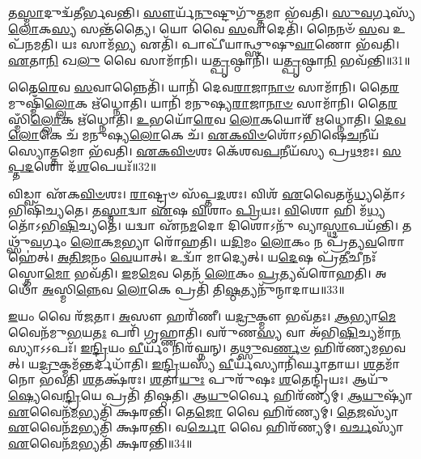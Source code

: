 𑌤\-\ul{𑌸𑍍𑌮𑌾}\-𑌦𑍁𑌦𑍍𑌵᳴𑌤𑍀𑌰𑍍𑌭𑌵𑌨𑍍𑌤𑌿।
\-\ul{𑌸𑍗}\-𑌰𑍍𑌯᳴\-\ul{𑌨𑍁}\-𑌷𑍍𑌟𑍁𑌗𑍁᳴\-\ul{𑌤𑍍𑌤}\-𑌮𑌾 𑌭᳴𑌵𑌤𑌿।
\-\ul{𑌸𑍁}\-\-\ul{𑌵}\-𑌰𑍍𑌗𑌸𑍍𑌯᳴ \ul{𑌲𑍋}\-𑌕\-\ul{𑌸𑍍𑌯} 𑌸𑌨𑍍𑌤᳴𑌤𑍍𑌯𑍈।
𑌯𑍋 𑌵𑍈 \ul{𑌸}\-𑌵𑌾𑌦𑍇𑌤𑌿᳴।
𑌨𑍈𑌨𑍞᳴ \ul{𑌸}\-𑌵 𑌉𑌪᳴𑌨𑌮𑌤𑌿।
𑌯𑌃 𑌸𑌾𑌮᳴\-\ul{𑌭𑍍𑌯} 𑌏𑌤𑌿᳴।
𑌪𑌾𑌪𑍀᳴𑌯𑌾𑌨𑍍𑌥𑍍𑌸𑍁𑌷𑍁\-\ul{𑌵𑌾}\-𑌣𑍋 𑌭᳴𑌵𑌤𑌿।
\-\ul{𑌏}\-𑌤𑌾\-\ul{𑌨𑌿} 𑌖\-\ul{𑌲𑍁} 𑌵𑍈 𑌸𑌾𑌮𑌾᳴𑌨𑌿।
𑌯\-\ul{𑌤𑍍𑌪𑍃}\-𑌷𑍍𑌠𑌾𑌨𑌿᳴।
𑌯\-\ul{𑌤𑍍𑌪𑍃}\-𑌷𑍍𑌠𑌾\-\ul{𑌨𑌿} 𑌭𑌵᳴𑌨𑍍𑌤𑌿॥31॥

𑌤𑍈\-\ul{𑌰𑍇}\-𑌵 \ul{𑌸}\-𑌵𑌾𑌨𑍍𑌨𑍈𑌤𑌿᳴।
𑌯𑌾𑌨𑌿᳴ 𑌦𑍇𑌵\-\ul{𑌰𑌾}\-𑌜𑌾\-\ul{𑌨𑌾}\-\-\ul{𑍞} 𑌸𑌾𑌮𑌾᳴𑌨𑌿।
𑌤𑍈\-\ul{𑌰}\-𑌮𑍁𑌷𑍍𑌮𑌿𑌁᳴\-\ul{𑌲𑍍𑌲𑍋}\-𑌕 𑌋᳴𑌧𑍍𑌨𑍋𑌤𑌿।
𑌯𑌾𑌨𑌿᳴ 𑌮𑌨𑍁𑌷𑍍𑌯\-\ul{𑌰𑌾}\-𑌜𑌾\-\ul{𑌨𑌾}\-\-\ul{𑍞} 𑌸𑌾𑌮𑌾᳴𑌨𑌿।
𑌤𑍈\-\ul{𑌰}\-𑌸𑍍𑌮𑌿𑌁\-\ul{𑌲𑍍𑌲𑍋}\-𑌕 𑌋᳴𑌧𑍍𑌨𑍋𑌤𑌿।
\-\ul{𑌉}\-𑌭𑌯𑍋᳴\-\ul{𑌰𑍇}\-𑌵 \ul{𑌲𑍋}\-𑌕𑌯𑍋𑌰𑍍᳴ 𑌋𑌧𑍍𑌨𑍋𑌤𑌿।
\-\ul{𑌦𑍇}\-\-\ul{𑌵}\-\-\ul{𑌲𑍋}\-𑌕𑍇 𑌚᳴ 𑌮𑌨𑍁𑌷𑍍𑌯\-\ul{𑌲𑍋}\-𑌕𑍇 𑌚᳴।
\-\ul{𑌏}\-\-\ul{𑌕}\-\-\ul{𑌵𑌿}\-\-\ul{𑍞}\-𑌶𑍋᳴\-𑌽𑌭𑌿𑌷𑍇\-\ul{𑌚}\-𑌨𑍀𑌯᳴𑌸𑍍𑌯𑍋\-\ul{𑌤𑍍𑌤}\-𑌮𑍋 𑌭᳴𑌵𑌤𑌿।
\-\ul{𑌏}\-\-\ul{𑌕}\-\-\ul{𑌵𑌿}\-\-\ul{𑍞}\-𑌶𑌃 𑌕𑍇᳴𑌶𑌵\-\ul{𑌪}\-𑌨𑍀𑌯᳴𑌸𑍍𑌯 𑌪𑍍𑌰\-\ul{𑌥}\-𑌮𑌃।
\-\ul{𑌸}\-\-\ul{𑌪𑍍𑌤}\-\-\ul{𑌦}\-𑌶𑍋 𑌦᳴\-\ul{𑌶}\-𑌪𑍇𑌯𑌃᳴॥32॥

𑌵𑌿𑌡𑍍𑌵𑌾 𑌏᳴𑌕\-\ul{𑌵𑌿}\-\-\ul{𑍞}\-𑌶𑌃।
\-\ul{𑌰𑌾}\-𑌷𑍍𑌟𑍍𑌰𑍞 𑌸᳴𑌪𑍍𑌤\-\ul{𑌦}\-𑌶𑌃।
𑌵𑌿𑌶᳴ \ul{𑌏}\-𑌵𑍈𑌤𑌨𑍍𑌮᳴\-\ul{𑌧𑍍𑌯}\-𑌤𑍋᳴\-𑌽𑌭𑌿𑌷𑌿᳴𑌚𑍍𑌯𑌤𑍇।
𑌤\-\ul{𑌸𑍍𑌮𑌾}\-𑌦𑍍𑌵𑌾 \ul{𑌏}\-𑌷 \ul{𑌵𑌿}\-𑌶𑌾𑌂 \ul{𑌪𑍍𑌰𑌿}\-𑌯𑌃।
\-\ul{𑌵𑌿}\-𑌶𑍋 𑌹𑌿 𑌮᳴\-\ul{𑌧𑍍𑌯}\-𑌤𑍋᳴\-𑌽𑌭𑌿\-\ul{𑌷𑌿}\-𑌚𑍍𑌯𑌤𑍇॑।
𑌯𑌦𑍍𑌵𑌾 𑌏᳴𑌨\-\ul{𑌮}\-𑌦𑍋 𑌦𑌿𑌶𑍋𑌽𑌨𑍁᳴ 𑌵𑍍𑌯𑌾\-\ul{𑌸𑍍𑌥𑌾}\-𑌪𑌯᳴𑌨𑍍𑌤𑌿।
𑌤𑌥𑍍𑌸𑍁᳴\-\ul{𑌵}\-𑌰𑍍𑌗𑌂 \ul{𑌲𑍋}\-𑌕\-\ul{𑌮}\-𑌭𑍍𑌯𑌾 𑌰𑍋᳴𑌹𑌤𑌿।
𑌯\-\ul{𑌦𑌿}\-𑌮𑌂 \ul{𑌲𑍋}\-𑌕𑌂 𑌨 𑌪𑍍𑌰᳴𑌤𑍍𑌯\-\ul{𑌵}\-𑌰𑍋𑌹𑍇॑𑌤𑍍।
\-\ul{𑌅}\-\-\ul{𑌤𑌿}\-\-\ul{𑌜}\-𑌨𑌂 \ul{𑌵𑍇}\-𑌯𑌾𑌤𑍍।
𑌉𑌦𑍍𑌵𑌾᳴ 𑌮𑌾𑌦𑍍𑌯𑍇𑌤𑍍।
𑌯\-\ul{𑌦𑍇}\-𑌷 𑌪𑍍𑌰᳴\-\ul{𑌤𑍀}\-𑌚𑍀𑌨𑌃᳴ 𑌸𑍍𑌤𑍋\-\ul{𑌮𑍋} 𑌭𑌵᳴𑌤𑌿।
\-\ul{𑌇}\-𑌮\-\ul{𑌮𑍇}\-𑌵 𑌤𑍇𑌨᳴ \ul{𑌲𑍋}\-𑌕𑌂 \ul{𑌪𑍍𑌰}\-𑌤𑍍𑌯𑌵᳴𑌰𑍋𑌹𑌤𑌿।
𑌅𑌥𑍋᳴ \ul{𑌅}\-𑌸𑍍𑌮𑌿\-\ul{𑌨𑍍𑌨𑍇}\-𑌵 \ul{𑌲𑍋}\-𑌕𑍇 𑌪𑍍𑌰𑌤𑌿᳴ 𑌤𑌿\-\ul{𑌷𑍍𑌠}\-𑌤𑍍𑌯𑌨𑍁᳴𑌨𑍍𑌮𑌾𑌦𑌾𑌯॥33॥\anuvakamend[𑌅𑌕𑍍𑌰᳴𑌨𑍍𑌰𑌾\-\ul{𑌜}\-𑌨𑍍𑌯𑍋᳴ 𑌭𑌵᳴𑌨𑍍𑌤𑌿 𑌦\-\ul{𑌶}\-𑌪𑍇𑌯𑍋᳴ 𑌮𑌾\-\ul{𑌦𑍍𑌯𑍇}\-𑌤𑍍𑌤𑍍𑌰𑍀𑌣𑌿᳴ 𑌚]

\-\ul{𑌇}\-𑌯𑌂 𑌵𑍈 𑌰᳴\-\ul{𑌜}\-𑌤𑌾।
\-\ul{𑌅}\-𑌸𑍗 𑌹𑌰𑌿᳴𑌣𑍀।
𑌯\-\ul{𑌦𑍍𑌰𑍁}\-𑌕𑍍𑌮𑍗 𑌭𑌵᳴𑌤𑌃।
\-\ul{𑌆}\-𑌭𑍍𑌯𑌾\-\ul{𑌮𑍇}\-𑌵𑍈𑌨᳴𑌮𑍁\-\ul{𑌭}\-𑌯\-\ul{𑌤𑌃} 𑌪𑌰𑌿᳴ 𑌗𑍃𑌹𑍍𑌣𑌾𑌤𑌿।
𑌵𑌰𑍁᳴𑌣\-\ul{𑌸𑍍𑌯} 𑌵𑌾 𑌅᳴𑌭𑌿\-\ul{𑌷𑌿}\-𑌚𑍍𑌯𑌮𑌾᳴\-\ul{𑌨}\-𑌸𑍍𑌯𑌾\-𑌽𑌽𑌪𑌃᳴।
\-\ul{𑌇}\-\-\ul{𑌨𑍍𑌦𑍍𑌰𑌿}\-𑌯𑌂 \ul{𑌵𑍀}\-𑌰𑍍𑌯𑌂᳴ 𑌨𑌿𑌰᳴𑌘𑍍𑌨𑌨𑍍।
𑌤\-\ul{𑌥𑍍𑌸𑍁}\-𑌵\-\ul{𑌰𑍍𑌣}\-\-\ul{𑍞} 𑌹𑌿𑌰᳴𑌣𑍍𑌯𑌮𑌭𑌵𑌤𑍍।
𑌯\-\ul{𑌦𑍍𑌰𑍁}\-𑌕𑍍𑌮𑌮᳴\-\ul{𑌨𑍍𑌤}\-𑌰𑍍𑌦\-𑌧𑌾᳴𑌤𑌿।
\-\ul{𑌇}\-\-\ul{𑌨𑍍𑌦𑍍𑌰𑌿}\-𑌯𑌸𑍍𑌯᳴ \ul{𑌵𑍀}\-𑌰𑍍𑌯᳴𑌸𑍍𑌯𑌾\-𑌨𑌿᳴𑌰𑍍𑌘𑌾𑌤𑌾𑌯।
\-\ul{𑌶}\-𑌤𑌮𑌾᳴𑌨𑍋 𑌭𑌵𑌤𑌿 \ul{𑌶}\-𑌤𑌕𑍍𑌷᳴𑌰𑌃।
\-\ul{𑌶}\-𑌤𑌾\-\ul{𑌯𑍁𑌃} 𑌪𑍁𑌰𑍁᳴𑌷𑌃 \ul{𑌶}\-𑌤𑍇𑌨𑍍𑌦𑍍𑌰𑌿᳴𑌯𑌃।
𑌆𑌯𑍁᳴\-\ul{𑌷𑍍𑌯𑍇}\-𑌵𑍇\-\ul{𑌨𑍍𑌦𑍍𑌰𑌿}\-𑌯𑍇 𑌪𑍍𑌰𑌤𑌿᳴ 𑌤𑌿𑌷𑍍𑌠𑌤𑌿।
𑌆\-\ul{𑌯𑍁}\-𑌰𑍍𑌵𑍈 𑌹𑌿𑌰᳴𑌣𑍍𑌯𑌮𑍍।
\-\ul{𑌆}\-\-\ul{𑌯𑍁}\-𑌷𑍍𑌯𑌾᳴ \ul{𑌏}\-𑌵𑍈𑌨᳴\-\ul{𑌮}\-𑌭𑍍𑌯𑌤𑌿᳴ 𑌕𑍍𑌷𑌰𑌨𑍍𑌤𑌿।
𑌤𑍇\-\ul{𑌜𑍋} 𑌵𑍈 𑌹𑌿𑌰᳴𑌣𑍍𑌯𑌮𑍍।
\-\ul{𑌤𑍇}\-\-\ul{𑌜}\-𑌸𑍍𑌯𑌾᳴ \ul{𑌏}\-𑌵𑍈𑌨᳴\-\ul{𑌮}\-𑌭𑍍𑌯𑌤𑌿᳴ 𑌕𑍍𑌷𑌰𑌨𑍍𑌤𑌿।
𑌵\-\ul{𑌰𑍍𑌚𑍋} 𑌵𑍈 𑌹𑌿𑌰᳴𑌣𑍍𑌯𑌮𑍍।
\-\ul{𑌵}\-\-\ul{𑌰𑍍𑌚}\-𑌸𑍍𑌯𑌾᳴ \ul{𑌏}\-𑌵𑍈𑌨᳴\-\ul{𑌮}\-𑌭𑍍𑌯𑌤𑌿᳴ 𑌕𑍍𑌷𑌰𑌨𑍍𑌤𑌿॥34॥\anuvakamend[\-\ul{𑌶}\-𑌤𑌕𑍍𑌷᳴\-\ul{𑌰𑍋}\-\-𑌽𑌷𑍍𑌟𑍗 𑌚᳴]

